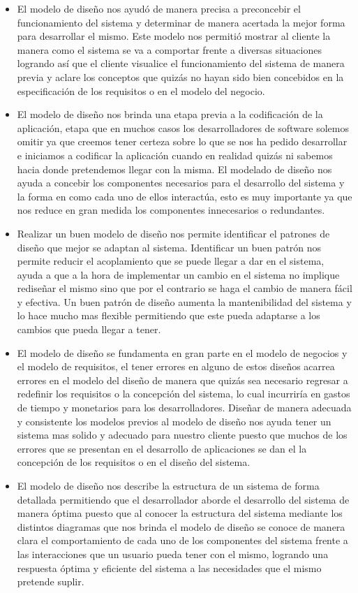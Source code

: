 \documentclass[12pt,oneside,letterpaper]{report}
\begin{document}
\begin{itemize}
 \item El modelo de diseño nos ayudó de manera precisa a preconcebir el funcionamiento del sistema y determinar de manera acertada la mejor forma para desarrollar el mismo. Este modelo nos permitió mostrar al cliente la manera como el sistema se va a comportar frente a diversas situaciones logrando así que el cliente visualice el funcionamiento del sistema de manera previa y aclare los conceptos que quizás no hayan sido bien concebidos en la especificación de los requisitos o en el modelo del negocio. 
 \item El modelo de diseño nos brinda una etapa previa a la codificación de la aplicación, etapa que en muchos casos los desarrolladores de software solemos omitir ya que creemos tener certeza sobre lo que se nos ha pedido desarrollar e iniciamos a codificar la aplicación cuando en realidad quizás ni sabemos hacia donde pretendemos llegar con la misma. El modelado de diseño nos ayuda a concebir los componentes necesarios para el desarrollo del sistema y la forma en como cada uno de ellos interactúa, esto es muy importante ya que nos reduce en gran medida los componentes innecesarios o redundantes.
 \item Realizar un buen modelo de diseño nos permite identificar el patrones de diseño que mejor se adaptan al sistema. Identificar un buen patrón  nos permite reducir el acoplamiento que se puede llegar a dar en el sistema, ayuda a que a la hora de implementar un cambio en el sistema no implique rediseñar el mismo sino que por el contrario se haga el cambio de manera fácil y efectiva. Un buen patrón de diseño aumenta la mantenibilidad del sistema y lo hace mucho mas flexible permitiendo que este pueda adaptarse a los cambios que pueda llegar a tener.
 \item El modelo de diseño se fundamenta en gran parte en el modelo de negocios y el modelo de requisitos, el tener errores en alguno de estos diseños acarrea errores en el modelo del diseño de manera que quizás sea necesario regresar a redefinir los requisitos o la concepción del sistema, lo cual incurriría en gastos de tiempo y monetarios para los desarrolladores. Diseñar de manera adecuada y consistente los modelos previos al modelo de diseño nos ayuda tener un sistema mas solido y adecuado para nuestro cliente puesto que muchos de los errores que se presentan en el desarrollo de aplicaciones se dan el la concepción de los requisitos o en el diseño del sistema.
 \item El modelo de diseño nos describe la estructura de un sistema de forma detallada permitiendo que el desarrollador aborde el desarrollo del sistema de manera óptima puesto que al conocer la estructura del sistema mediante los distintos diagramas que nos brinda el modelo de diseño se conoce de manera clara el comportamiento de cada uno de los componentes del sistema frente a las interacciones que un usuario pueda tener con el mismo, logrando una respuesta óptima y eficiente del sistema a las necesidades que el mismo pretende suplir.

\end{itemize}
\end{document}
